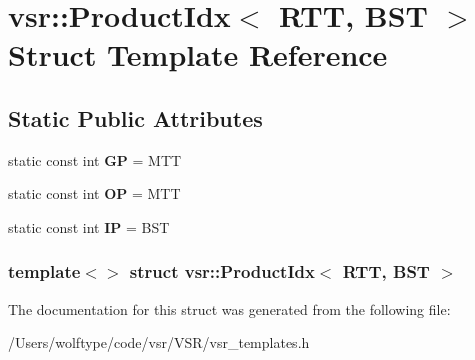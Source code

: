 \hypertarget{structvsr_1_1_product_idx_3_01_r_t_t_00_01_b_s_t_01_4}{\section{vsr\-:\-:Product\-Idx$<$ R\-T\-T, B\-S\-T $>$ Struct Template Reference}
\label{structvsr_1_1_product_idx_3_01_r_t_t_00_01_b_s_t_01_4}
}
\subsection*{Static Public Attributes}
\begin{DoxyCompactItemize}
\item 
\hypertarget{structvsr_1_1_product_idx_3_01_r_t_t_00_01_b_s_t_01_4_a221171ccd841e5a88479a4b5ac3eeffa}{static const int {\bfseries G\-P} = M\-T\-T}\label{structvsr_1_1_product_idx_3_01_r_t_t_00_01_b_s_t_01_4_a221171ccd841e5a88479a4b5ac3eeffa}

\item 
\hypertarget{structvsr_1_1_product_idx_3_01_r_t_t_00_01_b_s_t_01_4_af839e352fa77e87a3cfee5d4f4a32739}{static const int {\bfseries O\-P} = M\-T\-T}\label{structvsr_1_1_product_idx_3_01_r_t_t_00_01_b_s_t_01_4_af839e352fa77e87a3cfee5d4f4a32739}

\item 
\hypertarget{structvsr_1_1_product_idx_3_01_r_t_t_00_01_b_s_t_01_4_a4641161ebe55cdcd324d41ef13a2f587}{static const int {\bfseries I\-P} = B\-S\-T}\label{structvsr_1_1_product_idx_3_01_r_t_t_00_01_b_s_t_01_4_a4641161ebe55cdcd324d41ef13a2f587}

\end{DoxyCompactItemize}
\subsubsection*{template$<$$>$ struct vsr\-::\-Product\-Idx$<$ R\-T\-T, B\-S\-T $>$}



The documentation for this struct was generated from the following file\-:\begin{DoxyCompactItemize}
\item 
/\-Users/wolftype/code/vsr/\-V\-S\-R/vsr\-\_\-templates.\-h\end{DoxyCompactItemize}

